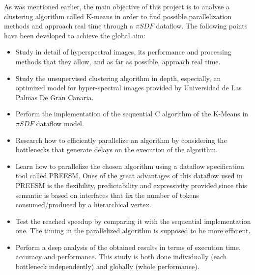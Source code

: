 As was mentioned earlier, the main objective of this project is to analyse a clustering algorithm called K-means in order to find possible parallelization methods and approach real time through a $\pi SDF$ dataflow. The following points have been developed to achieve the global aim:

 \begin{itemize}
 
 \item Study in detail of hyperspectral images, its performance and processing methods that they allow, and as far as possible, approach real time.

\item Study the unsupervised clustering algorithm in depth, especially, an optimized model for hyper-spectral images provided by Universidad de Las Palmas De Gran Canaria.

 \item Perform the implementation of the sequential C algorithm of the K-Means in $\pi SDF$ dataflow model.
  
\item  Research how to efficiently parallelize an algorithm by considering the bottlenecks that generate delays on the execution of the algorithm. 

\item  Learn how to parallelize the chosen algorithm using a dataflow specification tool called PREESM. Ones of the great advantages of this dataflow used in PREESM is the flexibility, predictability and expressivity provided,since this semantic is based on interfaces that fix the number of tokens consumed/produced by a hierarchical vertex.

\item Test the reached speedup by comparing it with the sequential implementation one. The timing in the parallelized algorithm is supposed to be more efficient.


\item Perform a deep analysis of the obtained results in terms of execution time, accuracy and performance. This study is both done individually (each bottleneck   independently) and globally (whole performance).
\end{itemize}